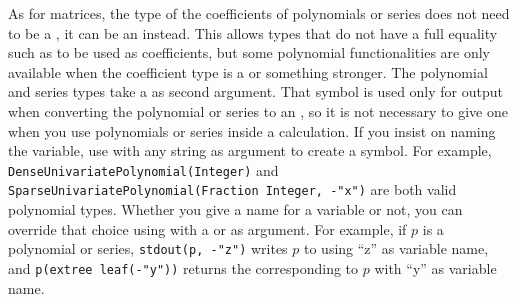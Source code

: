 As for matrices, the type of the coefficients of polynomials
or series does not need to be a , it can be an
 instead.
This allows types that do not have a full equality such
as  to be used as coefficients, but
some polynomial functionalities are only available when
the coefficient type is a  or something stronger.
The polynomial and series types take a  as
second argument. That symbol is used only for output when
converting the polynomial or series to an ,
so it is not necessary to give one when you use polynomials
or series inside a calculation. If you insist on naming the
variable, use  with any string as argument
to create a symbol. For example,
{\tt DenseUnivariatePolynomial(Integer)} and
{\tt SparseUnivariatePolynomial(Fraction Integer, -"x")}
are both valid polynomial types.
Whether you give a name for a variable or not, you
can override that choice using 
with a  or  as argument.
For example, if $p$ is a polynomial or series,
{\tt stdout(p, -"z")} writes $p$ to 
using ``z'' as variable name, and {\tt p(extree leaf(-"y"))}
returns the  corresponding to $p$ with
``y'' as variable name.

